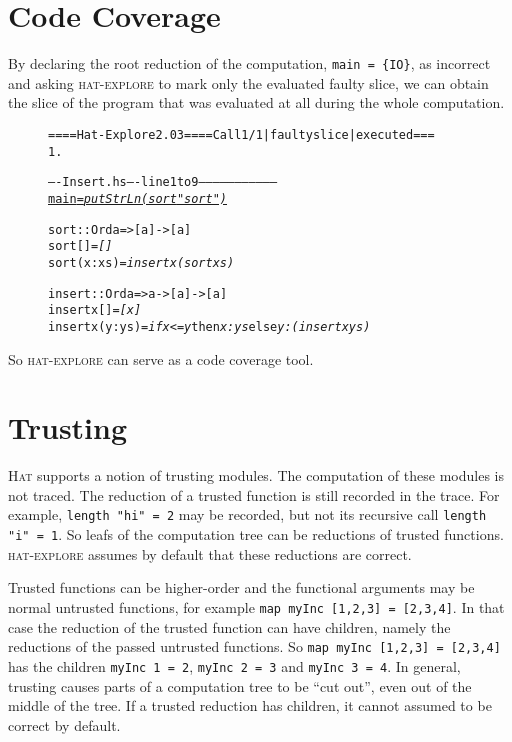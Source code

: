 \documentclass[12pt]{article}
\newcommand{\Hat}{\textsc{Hat}\xspace}
\newcommand{\hatexplore}{\textsc{hat-explore}\xspace}
\newenvironment{shot}{\begin{figure}[!h]\vspace{-0.2cm}\begin{center}
\begin{minipage}{80ex}\begin{alltt}}{\end{alltt}\end{minipage}\end{center}\vspace{-0.6cm}\end{figure}}
\newcommand{\byellow}[1]{\psframebox[linecolor=yellow,fillstyle=solid,fillcolor=yellow]{#1\rule[-0.3ex]{0ex}{1.9ex}}}
\begin{document}
\section{Code Coverage}

By declaring the root reduction of the computation, \texttt{main~= \{IO\}}, as incorrect and asking \hatexplore to mark only the evaluated faulty slice, we can obtain the slice of the program that was evaluated at all during the whole computation.

\begin{shot}
==== Hat-Explore 2.03 ==== Call 1/1 | faulty slice | executed ===
 1. \underline{\byellow{main = \{IO\}}}


---- Insert.hs ---- line 1 to 9 ---------------------------------
\underline{main = \emph{putStrLn (sort "sort")}}

sort :: Ord a => [a] -> [a]
sort [] = \emph{[]}
sort (x:xs) = \emph{insert x (sort xs)}

insert :: Ord a => a -> [a] -> [a]
insert x [] = \emph{[x]}
insert x (y:ys) = \emph{if x <= y} then \emph{x : ys} else \emph{y : (insert x ys)}
\end{shot}

\noindent 
So \hatexplore can serve as a code coverage tool.


\section{Trusting}

\Hat supports a notion of trusting modules. The computation of these modules is not traced. The reduction of a trusted function is still recorded in the trace. For example, \texttt{length "hi" = 2} may be recorded, but not its recursive call \texttt{length "i" = 1}. So leafs of the computation tree can be reductions of trusted functions. \hatexplore assumes by default that these reductions are correct.

Trusted functions can be higher-order and the functional arguments may be normal untrusted functions, for example \texttt{map myInc [1,2,3] = [2,3,4]}. In that case the reduction of the trusted function can have children, namely the reductions of the passed untrusted functions. So \texttt{map myInc [1,2,3] = [2,3,4]} has the children \texttt{myInc 1 = 2}, \texttt{myInc 2 = 3} and \texttt{myInc 3 = 4}. In general, trusting causes parts of a computation tree to be ``cut out'', even out of the middle of the tree. If a trusted reduction has children, it cannot assumed to be correct by default.
\end{document}
